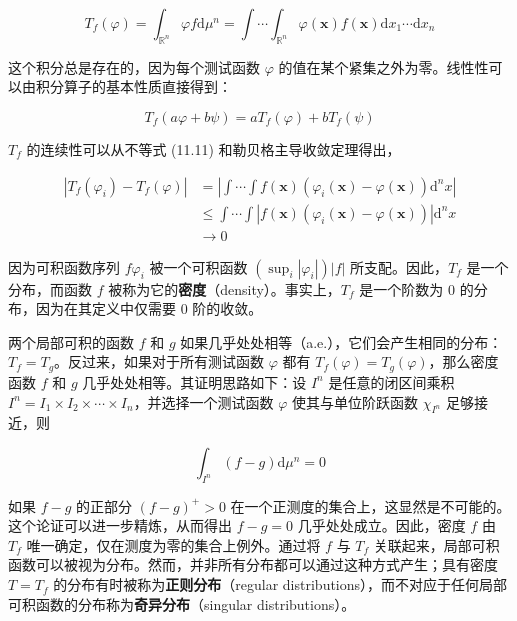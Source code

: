 \[
T_f(\varphi) = \int_{\mathbb{R}^n} \varphi f \mathrm{d}\mu^n = \int \cdots \int_{\mathbb{R}^n} \varphi(\mathbf{x}) f(\mathbf{x}) \mathrm{d}x_1 \cdots \mathrm{d}x_n
\]

这个积分总是存在的，因为每个测试函数 \(\varphi\)
的值在某个紧集之外为零。线性性可以由积分算子的基本性质直接得到：

\[
T_f(a \varphi + b \psi) = a T_f(\varphi) + b T_f(\psi)
\]

\(T_f\) 的连续性可以从不等式 (11.11) 和勒贝格主导收敛定理得出，

\[
\begin{aligned}
\left|T_f(\varphi_i) - T_f(\varphi)\right| &= \left|\int \cdots \int f(\mathbf{x})\left(\varphi_i(\mathbf{x}) - \varphi(\mathbf{x})\right) \mathrm{d}^n x\right| \\
&\leq \int \cdots \int \left|f(\mathbf{x})\left(\varphi_i(\mathbf{x}) - \varphi(\mathbf{x})\right)\right| \mathrm{d}^n x \\
&\to 0
\end{aligned}
\]

因为可积函数序列 \(f \varphi_i\) 被一个可积函数
\(\left(\sup_i |\varphi_i|\right)|f|\) 所支配。因此，\(T_f\)
是一个分布，而函数 \(f\)
被称为它的\textbf{密度}（density）。事实上，\(T_f\) 是一个阶数为 0
的分布，因为在其定义中仅需要 0 阶的收敛。

两个局部可积的函数 \(f\) 和 \(g\)
如果几乎处处相等（a.e.），它们会产生相同的分布：\(T_f = T_g\)。反过来，如果对于所有测试函数
\(\varphi\) 都有 \(T_f(\varphi) = T_g(\varphi)\)，那么密度函数 \(f\) 和
\(g\) 几乎处处相等。其证明思路如下：设 \(I^n\) 是任意的闭区间乘积
\(I^n = I_1 \times I_2 \times \cdots \times I_n\)，并选择一个测试函数
\(\varphi\) 使其与单位阶跃函数 \(\chi_{I^n}\) 足够接近，则

\[
\int_{I^n}(f - g) \mathrm{d}\mu^n = 0
\]

如果 \(f - g\) 的正部分 \((f - g)^+ > 0\)
在一个正测度的集合上，这显然是不可能的。这个论证可以进一步精炼，从而得出
\(f - g = 0\) 几乎处处成立。因此，密度 \(f\) 由 \(T_f\)
唯一确定，仅在测度为零的集合上例外。通过将 \(f\) 与 \(T_f\)
关联起来，局部可积函数可以被视为分布。然而，并非所有分布都可以通过这种方式产生；具有密度
\(T = T_f\) 的分布有时被称为\textbf{正则分布}（regular
distributions），而不对应于任何局部可积函数的分布称为\textbf{奇异分布}（singular
distributions）。

